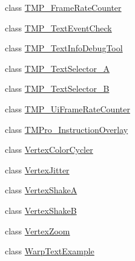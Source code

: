 \begin{DoxyCompactItemize}
\item 
class \hyperlink{class_t_m_pro_1_1_examples_1_1_t_m_p___frame_rate_counter}{T\+M\+P\+\_\+\+Frame\+Rate\+Counter}
\item 
class \hyperlink{class_t_m_pro_1_1_examples_1_1_t_m_p___text_event_check}{T\+M\+P\+\_\+\+Text\+Event\+Check}
\item 
class \hyperlink{class_t_m_pro_1_1_examples_1_1_t_m_p___text_info_debug_tool}{T\+M\+P\+\_\+\+Text\+Info\+Debug\+Tool}
\item 
class \hyperlink{class_t_m_pro_1_1_examples_1_1_t_m_p___text_selector___a}{T\+M\+P\+\_\+\+Text\+Selector\+\_\+A}
\item 
class \hyperlink{class_t_m_pro_1_1_examples_1_1_t_m_p___text_selector___b}{T\+M\+P\+\_\+\+Text\+Selector\+\_\+B}
\item 
class \hyperlink{class_t_m_pro_1_1_examples_1_1_t_m_p___ui_frame_rate_counter}{T\+M\+P\+\_\+\+Ui\+Frame\+Rate\+Counter}
\item 
class \hyperlink{class_t_m_pro_1_1_examples_1_1_t_m_pro___instruction_overlay}{T\+M\+Pro\+\_\+\+Instruction\+Overlay}
\item 
class \hyperlink{class_t_m_pro_1_1_examples_1_1_vertex_color_cycler}{Vertex\+Color\+Cycler}
\item 
class \hyperlink{class_t_m_pro_1_1_examples_1_1_vertex_jitter}{Vertex\+Jitter}
\item 
class \hyperlink{class_t_m_pro_1_1_examples_1_1_vertex_shake_a}{Vertex\+ShakeA}
\item 
class \hyperlink{class_t_m_pro_1_1_examples_1_1_vertex_shake_b}{Vertex\+ShakeB}
\item 
class \hyperlink{class_t_m_pro_1_1_examples_1_1_vertex_zoom}{Vertex\+Zoom}
\item 
class \hyperlink{class_t_m_pro_1_1_examples_1_1_warp_text_example}{Warp\+Text\+Example}
\end{DoxyCompactItemize}
